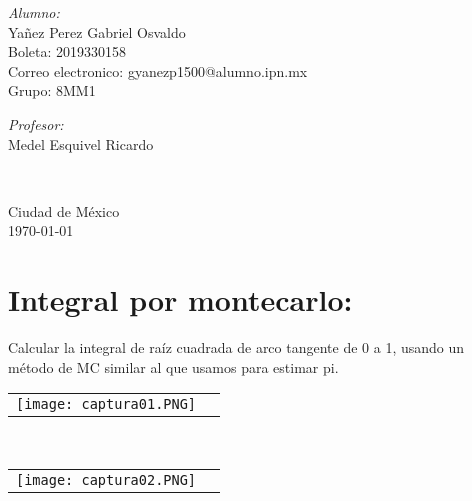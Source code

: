 \documentclass[10pt]{article}\usepackage[]{graphicx}\usepackage[]{color}
\begin{document}
\begin{center}
\begin{minipage}{0.46\textwidth}
\begin{flushleft}
\emph{Alumno:}\\	
Yañez Perez Gabriel Osvaldo\\
Boleta: 2019330158\\
Correo electronico: gyanezp1500@alumno.ipn.mx\\
Grupo: 8MM1
\end{flushleft}																		%
\end{minipage}		
\begin{minipage}{0.52\textwidth}		
\vspace{-0.6cm}											%
\begin{flushright} \large															%
\emph{Profesor:} \\																	%
Medel Esquivel Ricardo\\
\end{flushright}																	%
\end{minipage}	
\vspace*{1cm}
 	
 		\\																		%
\vspace{2cm} 																				
\begin{center}	
Ciudad de México  \\
{\large \today}																	%
 			\end{center}												  						
\end{center}							 											
																					
\newpage																			

\tableofcontents 
\newpage

\section{Integral por montecarlo:}
Calcular la integral de raíz cuadrada de arco tangente de 0 a 1, usando un método de MC similar al que usamos para estimar pi.


\begin{tabular}{p{} p{} }
\texttt{[image: captura01.PNG]}
\end{tabular}\\
\begin{tabular}{p{} p{} }
\texttt{[image: captura02.PNG]}
\end{tabular}\\
\end{document}
